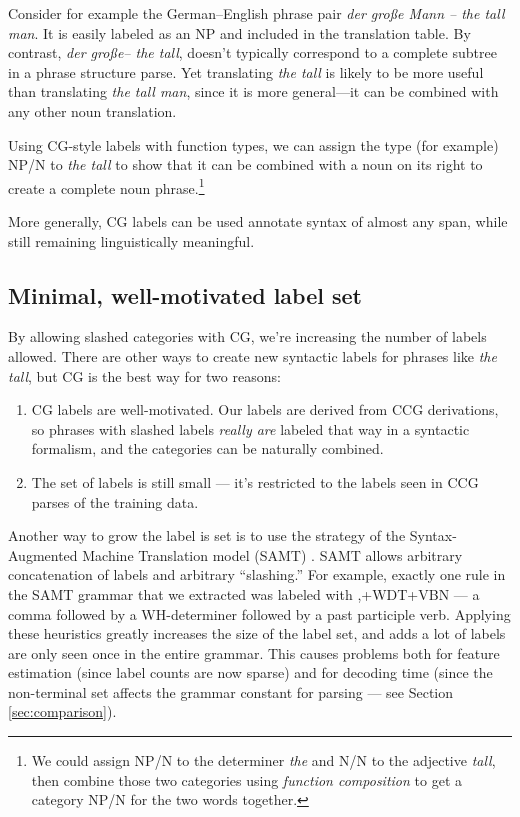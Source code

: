 \documentclass[a4paper]{article}
\begin{document}
Consider for example the German--English phrase pair {\em der gro\ss{}e Mann -- the tall man}. It is easily labeled as an NP and included in the translation table. By contrast, {\em der gro\ss{}e-- the tall}, doesn't typically correspond to a complete subtree in a phrase structure parse. Yet translating {\em the tall} is likely to be more useful than translating {\em the tall man}, since it is more general---it can be combined with any other noun translation.

Using CG-style labels with function types, we can assign the type (for example) NP/N to {\em the tall} to show that it can be combined with a noun on its right to create a complete noun phrase.\footnote{We could assign NP/N to the determiner {\em the} and N/N to the adjective {\em tall}, then combine those two categories using {\em function composition} to get a category NP/N for the two words together.}

More generally, CG labels can be used annotate syntax of almost any span, while still remaining linguistically meaningful.

\subsection{Minimal, well-motivated label set}

By allowing slashed categories with CG, we're increasing the number of labels allowed. There are other ways to create new syntactic labels for phrases like {\em the tall}, but CG is the best way for two reasons:
\begin{enumerate}
\item CG labels are well-motivated. Our labels are derived from CCG derivations, so phrases with slashed labels {\em really are} labeled that way in a syntactic formalism, and the categories can be naturally combined.
\item The set of labels is still small --- it's restricted to the labels seen in CCG parses of the training data.
\end{enumerate}

Another way to grow the label is set is to use the strategy of the Syntax-Augmented Machine Translation model (SAMT) \cite{samt-wmt06}. SAMT allows arbitrary concatenation of labels and arbitrary ``slashing.'' For example, exactly one rule in the SAMT grammar that we extracted was labeled with ,+WDT+VBN --- a comma followed by a WH-determiner followed by a past participle verb. Applying these heuristics greatly increases the size of the label set, and adds a lot of labels are only seen once in the entire grammar. This causes problems both for feature estimation (since label counts are now sparse) and for decoding time (since the non-terminal set affects the grammar constant for parsing --- see Section \ref{sec:comparison}).
\end{document}
